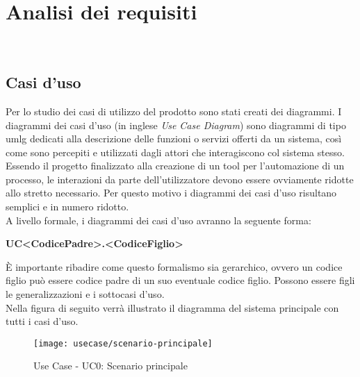 
\chapter{Analisi dei requisiti}
\label{cap:analisi-requisiti}

\noindent {}\\

\section{Casi d'uso}

\noindent Per lo studio dei casi di utilizzo del prodotto sono stati creati dei diagrammi.
I diagrammi dei casi d'uso (in inglese \emph{Use Case Diagram}) sono diagrammi di tipo \gls{umlg} dedicati alla descrizione delle funzioni o servizi offerti da un sistema, così come sono percepiti e utilizzati dagli attori che interagiscono col sistema stesso.
Essendo il progetto finalizzato alla creazione di un tool per l'automazione di un processo, le interazioni da parte dell'utilizzatore devono essere ovviamente ridotte allo stretto necessario. Per questo motivo i diagrammi dei casi d'uso risultano semplici e in numero ridotto.\\

\noindent A livello formale, i diagrammi dei casi d'uso avranno la seguente forma:
\begin{center}
    \textbf{UC<CodicePadre>.<CodiceFiglio>}
\end{center}
\noindent È importante ribadire come questo formalismo sia gerarchico, ovvero un codice figlio
può essere codice padre di un suo eventuale codice figlio. Possono essere figli le generalizzazioni e i sottocasi d'uso.\\

\noindent Nella figura di seguito verrà illustrato il diagramma del sistema principale con tutti i casi d'uso.
\begin{figure}[!h] 
    \centering 
    \texttt{[image: usecase/scenario-principale]} 
    \caption{Use Case - UC0: Scenario principale}
\end{figure}

